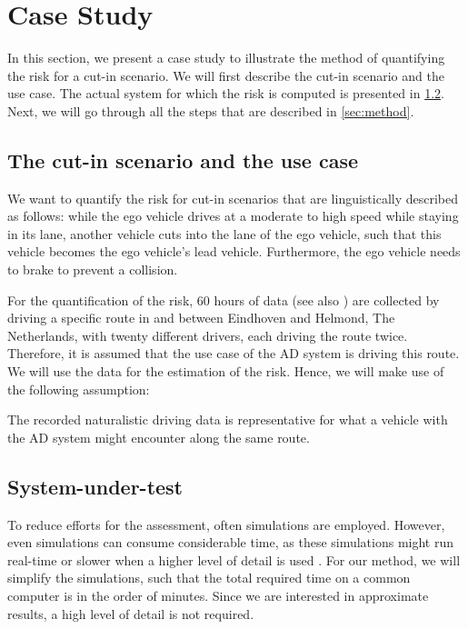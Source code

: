 \section{Case Study} %
\label{sec:example}

In this section, we present a case study to illustrate the method of quantifying the risk for a cut-in scenario. We will first describe the cut-in scenario and the use case. The actual system for which the risk is computed is presented in \cref{sec:system}. Next, we will go through all the steps that are described in \cref{sec:method}.



\subsection{The cut-in scenario and the use case}
\label{sec:scenario class}

We want to quantify the risk for cut-in scenarios that are linguistically described as follows: while the ego vehicle drives at a moderate to high speed while staying in its lane, another vehicle cuts into the lane of the ego vehicle, such that this vehicle becomes the ego vehicle's lead vehicle. Furthermore, the ego vehicle needs to brake to prevent a collision.

For the quantification of the risk, 60 hours of data (see also \cite{deGelder2017assessment}) are collected by driving a specific route in and between Eindhoven and Helmond, The Netherlands, with twenty different drivers, each driving the route twice. Therefore, it is assumed that the use case of the AD system is driving this route. We will use the data for the estimation of the risk. Hence, we will make use of the following assumption:
\begin{assumption}
	The recorded naturalistic driving data is representative for what a vehicle with the AD system might encounter along the same route.
\end{assumption}



\subsection{System-under-test}
\label{sec:system}

To reduce efforts for the assessment, often simulations are employed. However, even simulations can consume considerable time, as these simulations might run real-time \cite{shah2018airsim} or slower when a higher level of detail is used \cite{zofka2016testing}. For our method, we will simplify the simulations, such that the total required time on a common computer is in the order of minutes. Since we are interested in approximate results, a high level of detail is not required. 

